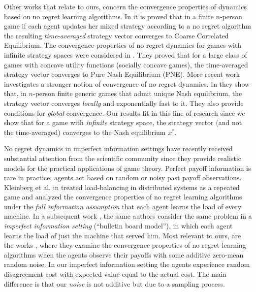 Other works that relate to ours, concern the convergence properties of dynamics
based on no regret learning algorithms.  In \cite{FV97,FS99,SA00,SALS15} it is
proved that in a finite $n$-person game if each agent updates her mixed
strategy according to a no regret algorithm the resulting \emph{time-averaged}
strategy vector converges to Coarse Correlated Equilibrium. The convergence
properties of no regret dynamics for games with infinite strategy spaces were
considered in \cite{EMN09}.  They proved that for a large class of games with
concave utility functions (socially concave games), the time-averaged strategy
vector converges to Pure Nash Equilibrium (PNE). More recent work investigates
a stronger notion of convergence of no regret dynamics. In \cite{CHM17} they
show that, in $n$-person finite generic games that admit unique Nash
equilibrium, the strategy vector converges \emph{locally} and exponentially
fast to it. They also provide conditions for \emph{global} convergence.  Our
results fit in this line of research since we show that for a game with
\emph{infinite} strategy space, the strategy vector (and not the time-averaged)
converges to the Nash equilibrium $x^*$.

No regret dynamics in imperfect information settings have recently received
substantial attention from the scientific community since they provide
realistic models for the practical applications of game theory.  Perfect payoff
information is rare in practice; agents act based on random or noisy past
payoff observations.  Kleinberg et al. in \cite{KPT09} treated load-balancing
in distributed systems as a repeated game and analyzed the convergence
properties of no regret learning algorithms under the \emph{full information
  assumption} that each agent learns the load of every machine.  In a
subsequent work \cite{KPT11}, the same authors consider the same problem in a
\emph{imperfect information setting} (\enquote{bulletin board model}), in which
each agent learns the load of just the machine that served him. Most relevant
to ours, are the works \cite{HCM17,MS17,BM17,CHM17}, where they examine the
convergence properties of no regret learning algorithms when the agents observe
their payoffs with some additive zero-mean random noise. In our imperfect
information setting the agents experience random disagreement cost with
expected value equal to the actual cost.  The main difference is that our
\emph{noise} is not additive but due to a sampling process.
